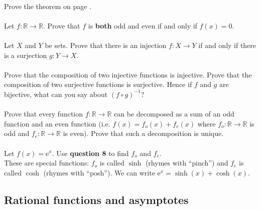 \documentclass[12pt, a4paper, titlepage, twoside]{article}
\newcommand*{\R}{\mathbb{R}}
\newcommand*{\e}{\textrm{e}}
\begin{document}
	\paragraph{}
	Prove the theorem on page \pageref*{fun-prop-ex}.
	
	\paragraph{}
	Let $f : \R \to \R$. Prove that $f$ is \textbf{both} odd and even if and only if $f(x) = 0$.
	
	\paragraph{}
	Let $X$ and $Y$ be sets. Prove that there is an injection $f : X \to Y$ if and only if there is a surjection $g : Y \to X$.
	
	\paragraph{}
	Prove that the composition of two injective functions is injective. Prove that the composition of two surjective functions is surjective.
	Hence if $f$ and $g$ are bijective, what can you say about $(f \circ g)^{-1}$?
	
	\paragraph{}
	Prove that every function $f : \R \to \R$ can be decomposed as a sum of an odd function and an even function (i.e. $f(x) = f_o(x) + f_e(x)$
	where $f_o : \R \to \R$ is odd and $f_e : \R \to \R$ is even). Prove that such a decomposition is unique.
	
	\paragraph{}
	Let $f(x) = \e^x$. Use \textbf{question 8} to find $f_o$ and $f_e$. \\ These are special functions: $f_o$ is called $\sinh$ (rhymes with 
	``pinch'') and $f_e$ is called $\cosh$ (rhymes with ``posh''). We can write $\e^x = \sinh(x) + \cosh(x)$.
	
	\newpage 
	
	\subsection{Rational functions and asymptotes}
	
\end{document}
